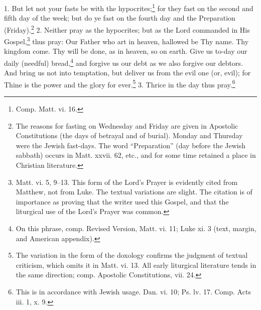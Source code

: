 1. But let not your fasts be with the hypocrites;\footnote{\par  Comp. Matt. vi. 16.} for they fast on the second and fifth day of the week; but do ye fast on the fourth day and the Preparation (Friday).\footnote{\par  The reasons for fasting on Wednesday and Friday are given in Apostolic Constitutions (the days of betrayal and of burial). Monday and Thursday were the Jewish fast-days. The word “Preparation” (day before the Jewish sabbath) occurs in Matt. xxvii. 62, etc., and for some time retained a place in Christian literature.} 2. Neither pray as the hypocrites; but as the Lord commanded in His Gospel,\footnote{\par  Matt. vi. 5, 9–13. This form of the Lord’s Prayer is evidently cited from Matthew, not from Luke. The textual variations are slight. The citation is of importance as proving that the writer used this Gospel, and that the liturgical use of the Lord’s Prayer was common.} thus pray: Our Father who art in heaven, hallowed be Thy name. Thy kingdom come. Thy will be done, as in heaven, so on earth. Give us to-day our daily (needful) bread,\footnote{\par  On this phrase, comp. Revised Version, Matt. vi. 11; Luke xi. 3 (text, margin, and American appendix).} and forgive us our debt as we also forgive our debtors. And bring us not into temptation, but deliver us from the evil one (or, evil); for Thine is the power and the glory for ever.\footnote{\par  The variation in the form of the doxology confirms the judgment of textual criticism, which omits it in Matt. vi. 13. All early liturgical literature tends in the same direction; comp. Apostolic Constitutions, vii. 24.} 3. Thrice in the day thus pray.\footnote{\par  This is in accordance with Jewish usage. Dan. vi. 10; Ps. lv. 17. Comp. Acts iii. 1, x. 9.}



